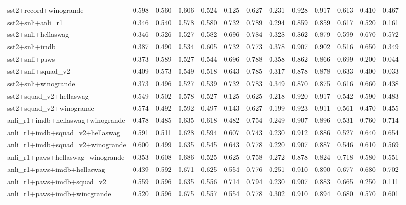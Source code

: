 \begin{table}[t]
\begin{tabular}{lrrrrrrrrrrrr}
    sst2+record+winogrande & 0.598 & 0.560 & 0.606 & 0.524 & 0.125 & 0.627 & 0.231 & 0.928 & 0.917 & 0.613 & 0.410 & 0.467 \\
    sst2+snli+anli\_r1 & 0.346 & 0.540 & 0.578 & 0.580 & 0.732 & 0.789 & 0.294 & 0.859 & 0.859 & 0.617 & 0.520 & 0.161 \\
    sst2+snli+hellaswag & 0.346 & 0.526 & 0.527 & 0.582 & 0.696 & 0.784 & 0.328 & 0.862 & 0.879 & 0.599 & 0.670 & 0.572 \\
    sst2+snli+imdb & 0.387 & 0.490 & 0.534 & 0.605 & 0.732 & 0.773 & 0.378 & 0.907 & 0.902 & 0.516 & 0.650 & 0.349 \\
    sst2+snli+paws & 0.373 & 0.589 & 0.527 & 0.544 & 0.696 & 0.788 & 0.358 & 0.862 & 0.866 & 0.699 & 0.200 & 0.044 \\
    sst2+snli+squad\_v2 & 0.409 & 0.573 & 0.549 & 0.518 & 0.643 & 0.785 & 0.317 & 0.878 & 0.878 & 0.633 & 0.400 & 0.033 \\
    sst2+snli+winogrande & 0.373 & 0.496 & 0.527 & 0.539 & 0.732 & 0.783 & 0.349 & 0.870 & 0.875 & 0.616 & 0.660 & 0.438 \\
    sst2+squad\_v2+hellaswag & 0.549 & 0.502 & 0.578 & 0.527 & 0.125 & 0.625 & 0.218 & 0.920 & 0.917 & 0.542 & 0.590 & 0.483 \\
    sst2+squad\_v2+winogrande & 0.574 & 0.492 & 0.592 & 0.497 & 0.143 & 0.627 & 0.199 & 0.923 & 0.911 & 0.561 & 0.470 & 0.455 \\
    \addlinespace
    anli\_r1+imdb+hellaswag+winogrande & 0.478 & 0.485 & 0.635 & 0.618 & 0.482 & 0.754 & 0.249 & 0.907 & 0.896 & 0.531 & 0.760 & 0.714 \\
    anli\_r1+imdb+squad\_v2+hellaswag & 0.591 & 0.511 & 0.628 & 0.594 & 0.607 & 0.743 & 0.230 & 0.912 & 0.886 & 0.527 & 0.640 & 0.654 \\
    anli\_r1+imdb+squad\_v2+winogrande & 0.600 & 0.499 & 0.635 & 0.545 & 0.643 & 0.778 & 0.220 & 0.907 & 0.887 & 0.546 & 0.610 & 0.569 \\
    anli\_r1+paws+hellaswag+winogrande & 0.353 & 0.608 & 0.686 & 0.525 & 0.625 & 0.758 & 0.272 & 0.878 & 0.824 & 0.718 & 0.580 & 0.551 \\
    anli\_r1+paws+imdb+hellaswag & 0.439 & 0.592 & 0.671 & 0.625 & 0.554 & 0.776 & 0.251 & 0.910 & 0.890 & 0.677 & 0.680 & 0.702 \\
    anli\_r1+paws+imdb+squad\_v2 & 0.559 & 0.596 & 0.635 & 0.556 & 0.714 & 0.794 & 0.230 & 0.907 & 0.883 & 0.665 & 0.250 & 0.111 \\
    anli\_r1+paws+imdb+winogrande & 0.520 & 0.596 & 0.675 & 0.557 & 0.554 & 0.778 & 0.302 & 0.910 & 0.894 & 0.680 & 0.570 & 0.601 \\

\end{tabular}
\end{table}
